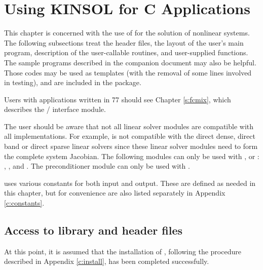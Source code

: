 \chapter{Using KINSOL for C Applications}\label{c:usage}

This chapter is concerned with the use of {\kinsol} for the solution
of nonlinear systems. The following subsections treat the header
files, the layout of the user's main program, description of the
{\kinsol} user-callable routines, and user-supplied functions.
The sample programs described in the companion document
\cite{kinsol_ex} may also be helpful.  Those codes may be used as
templates (with the removal of some lines involved in testing), and
are included in the {\kinsol} package.

Users with applications written in {\F}77 should see Chapter \ref{s:fcmix},
which describes the {\F}/{\C} interface module.

The user should be aware that not all linear solver modules are compatible 
with all {\nvector} implementations. 
For example, {\nvecp} is not compatible with the direct dense, direct
band or direct sparse linear solvers since these linear solver modules
need to form the complete 
system Jacobian. The following {\kinsol} modules can only be used with
{\nvecs}, {\nvecopenmp} or {\nvecpthreads}:
{\kindense}, {\kinband}, {\kinklu} and {\kinsuperlumt}. The
preconditioner module {\kinbbdpre} can only be used with {\nvecp}.

{\kinsol} uses various constants for both input and output. These are
defined as needed in this chapter, but for convenience are also listed
separately in Appendix \ref{c:constants}.

\section{Access to library and header files}\label{ss:file_access}

At this point, it is assumed that the installation of {\kinsol},
following the procedure described in Appendix \ref{c:install}, has
been completed successfully.

